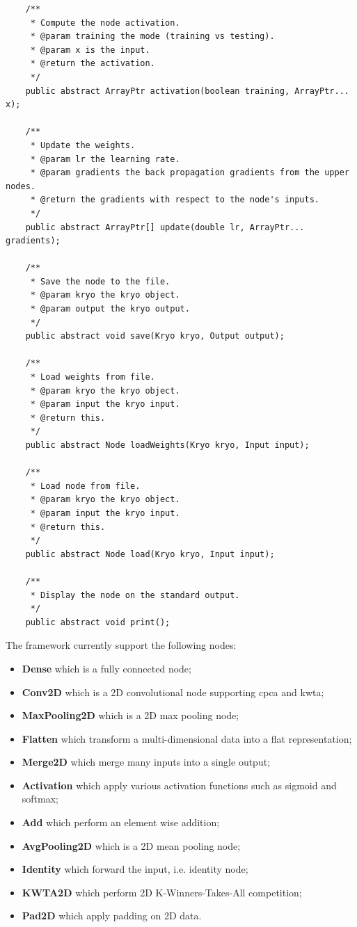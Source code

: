 \documentclass[11pt]{report}
\begin{document}
\begin{verbatim}
    /**
     * Compute the node activation.
     * @param training the mode (training vs testing).
     * @param x is the input.
     * @return the activation.
     */
    public abstract ArrayPtr activation(boolean training, ArrayPtr... x);

    /**
     * Update the weights.
     * @param lr the learning rate.
     * @param gradients the back propagation gradients from the upper nodes.
     * @return the gradients with respect to the node's inputs.
     */
    public abstract ArrayPtr[] update(double lr, ArrayPtr... gradients);

    /**
     * Save the node to the file.
     * @param kryo the kryo object.
     * @param output the kryo output.
     */
    public abstract void save(Kryo kryo, Output output);

    /**
     * Load weights from file.
     * @param kryo the kryo object.
     * @param input the kryo input.
     * @return this.
     */
    public abstract Node loadWeights(Kryo kryo, Input input);

    /**
     * Load node from file.
     * @param kryo the kryo object.
     * @param input the kryo input.
     * @return this.
     */
    public abstract Node load(Kryo kryo, Input input);

    /**
     * Display the node on the standard output.
     */
    public abstract void print();
\end{verbatim}

\noindent The framework currently support the following nodes:
\begin{itemize}
	\item \textbf{Dense} which is a fully connected node;
	\item \textbf{Conv2D} which is a 2D convolutional node supporting \acrshort{cpca} and  \acrshort{kwta};
	\item \textbf{MaxPooling2D} which is a 2D max pooling node;
	\item \textbf{Flatten} which transform a multi-dimensional data into a flat representation;
	\item \textbf{Merge2D} which merge many inputs into a single output;
	\item \textbf{Activation} which apply various activation functions such as sigmoid and softmax;
	\item \textbf{Add} which perform an element wise addition;
	\item \textbf{AvgPooling2D} which is a 2D mean pooling node;
	\item \textbf{Identity} which forward the input, i.e. identity node;
	\item \textbf{KWTA2D} which perform 2D K-Winners-Takes-All competition;
	\item \textbf{Pad2D} which apply padding on 2D data.
\end{itemize}
\end{document}
